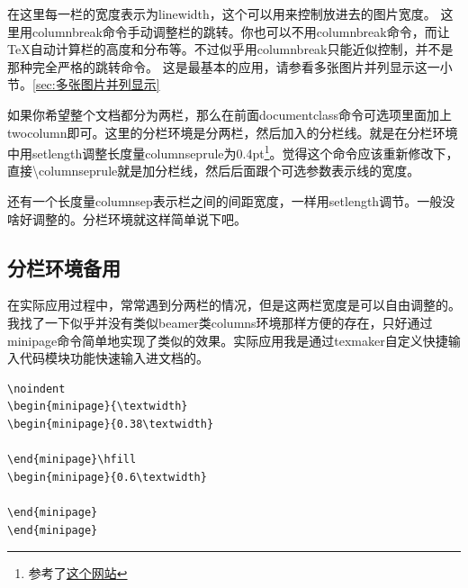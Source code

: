 \documentclass[12pt,oneside]{book}
\begin{document}
\begin{common-format}
在这里每一栏的宽度表示为linewidth，这个可以用来控制放进去的图片宽度。
这里用columnbreak命令手动调整栏的跳转。你也可以不用columnbreak命令，而让\TeX 自动计算栏的高度和分布等。不过似乎用columnbreak只能近似控制，并不是那种完全严格的跳转命令。
这是最基本的应用，请参看多张图片并列显示这一小节。\ref{sec:多张图片并列显示}



\begin{multicols}{2}
\setlength{\columnseprule}{0.4pt}
如果你希望整个文档都分为两栏，那么在前面documentclass命令可选项里面加上twocolumn即可。这里的分栏环境是分两栏，然后加入的分栏线。就是在分栏环境中用setlength调整长度量columnseprule为0.4pt\footnote{参考了\href{http://texblog.org/tag/columnseprule/}{这个网站}}。觉得这个命令应该重新修改下，直接\textbackslash columnseprule就是加分栏线，然后后面跟个可选参数表示线的宽度。

还有一个长度量columnsep表示栏之间的间距宽度，一样用setlength调节。一般没啥好调整的。分栏环境就这样简单说下吧。
\end{multicols}


\subsection{分栏环境备用}
在实际应用过程中，常常遇到分两栏的情况，但是这两栏宽度是可以自由调整的。我找了一下似乎并没有类似beamer类columns环境那样方便的存在，只好通过minipage命令简单地实现了类似的效果。实际应用我是通过texmaker自定义快捷输入代码模块功能快速输入进文档的。
\begin{Verbatim}
\noindent
\begin{minipage}{\textwidth}
\begin{minipage}{0.38\textwidth}

\end{minipage}\hfill
\begin{minipage}{0.6\textwidth}

\end{minipage} 
\end{minipage} 
\end{Verbatim}


\noindent
\begin{minipage}{\textwidth}
\begin{minipage}{0.3\textwidth}
\begin{table}[H]
\centering
\medskip 
{}
\caption*{表 2-1}
\end{table}


\end{minipage}
\end{minipage}
\end{common-format}
\end{document}

